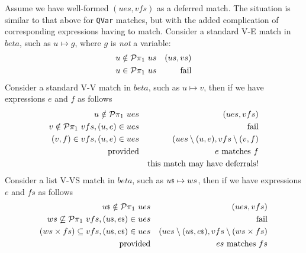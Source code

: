Assume we have well-formed $(ues,vfs)$ as a deferred match.
The situation is similar to that above for \texttt{QVar} matches,
but with the added complication of corresponding expressions having to match.
Consider  a standard V-E match in $beta$, such as $u \mapsto g$,
where $g$ is \emph{not} a variable:
\begin{eqnarray*}
   u \notin \mathcal{P}\pi_1~us  && (us,vs)
\\ u \in \mathcal{P}\pi_1~us      && \mbox{fail}
\end{eqnarray*}
Consider a standard V-V match in $beta$, such as $u \mapsto v$,
then if we have expressions $e$ and $f$ as follows
\begin{eqnarray*}
   u \notin \mathcal{P}\pi_1~ues  && (ues,vfs)
\\ v \notin \mathcal{P}\pi_1~vfs, (u,e) \in ues  && \mbox{fail}
\\ (v,f) \in vfs, (u,e) \in ues  && (ues \setminus (u,e), vfs \setminus (v,f)
\\ \mbox{provided} && e \mbox{ matches } f
\\ && \mbox{this match may have deferrals!}
\end{eqnarray*}
 Consider a list V-VS match in $beta$, such as ${u}{\scriptstyle\$} \mapsto ws$,
then if we have expressions $e$ and $fs$ as follows
\begin{eqnarray*}
   {u}{\scriptstyle\$} \notin \mathcal{P}\pi_1~ues  && (ues,vfs)
\\ ws \not\subseteq \mathcal{P}\pi_1~vfs, ({u}{\scriptstyle\$},{e}{\scriptstyle\$}) \in ues  && \mbox{fail}
\\ (ws\times fs) \subseteq vfs, ({u}{\scriptstyle\$},{e}{\scriptstyle\$}) \in ues
    && (ues \setminus ({u}{\scriptstyle\$},{e}{\scriptstyle\$}), vfs \setminus (ws\times fs)
\\ \mbox{provided} && es \mbox{ matches } fs
\end{eqnarray*}
